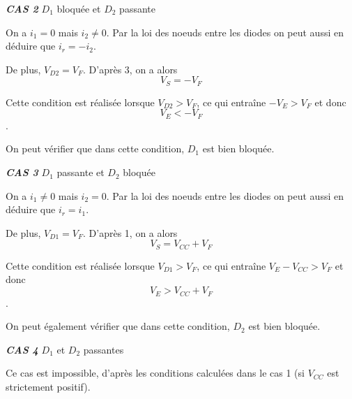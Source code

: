\documentclass[a4paper,french]{paper}
\begin{document}
\textbf{\textit{CAS 2}} $D_1$ bloquée et $D_2$ passante

On a $i_1 = 0$ mais $i_2 \neq 0$. Par la loi des noeuds entre les diodes on peut aussi en déduire que $i_r = -i_2$.

De plus, $V_{D2} = V_F$. D'après 3, on a alors $$\boxed{V_S = -V_F}$$

Cette condition est réalisée lorsque $V_{D2} > V_F$, ce qui entraîne $- V_E > V_F$ et donc $$\boxed{V_E < - V_F}$$.

On peut vérifier que dans cette condition, $D_1$ est bien bloquée.

\bigskip

\textbf{\textit{CAS 3}} $D_1$ passante et $D_2$ bloquée

On a $i_1 \neq 0$ mais $i_2 = 0$. Par la loi des noeuds entre les diodes on peut aussi en déduire que $i_r = i_1$.

De plus, $V_{D1} = V_F$. D'après 1, on a alors $$\boxed{V_S = V_{CC} + V_F}$$

Cette condition est réalisée lorsque $V_{D1} > V_F$, ce qui entraîne $V_E - V_{CC} > V_F$ et donc $$\boxed{V_E > V_{CC} + V_F}$$.

On peut également vérifier que dans cette condition, $D_2$ est bien bloquée.

\bigskip

\textbf{\textit{CAS 4}} $D_1$ et $D_2$ passantes

Ce cas est impossible, d'après les conditions calculées dans le cas 1 (si $V_{CC}$ est strictement positif).



\end{document}
